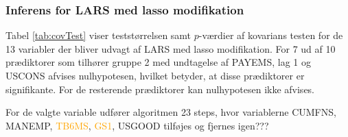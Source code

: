 





\newpage
\subsubsection{Inferens for LARS med lasso modifikation}
Tabel \ref{tab:covTest} viser teststørrelsen samt $p$-værdier af kovarians testen for de 13 variabler der bliver udvagt af LARS med lasso modifikation. 
For 7 ud af 10 prædiktorer som tilhører gruppe 2 med undtagelse af \textcolor{blue3}{PAYEMS}, \textcolor{blue3}{lag 1} og \textcolor{blue3}{USCONS} afvises nulhypotesen, hvilket betyder, at disse prædiktorer er signifikante.
For de resterende prædiktorer kan nulhypotesen ikke afvises.
%

%
For de valgte variable udfører algoritmen 23 steps, hvor variablerne  \textcolor{chartreuse4}{CUMFNS}, \textcolor{blue3}{MANEMP}, \textcolor{orange}{TB6MS}, \textcolor{orange}{GS1}, \textcolor{blue3}{USGOOD} tilføjes og fjernes igen???



\newpage


%
